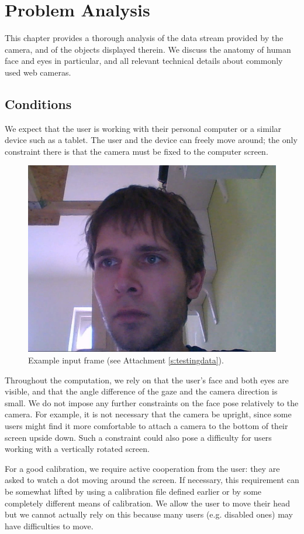 \chapter{Problem Analysis}
\label{s:analy}
This chapter provides a thorough analysis of the data stream provided by the camera, and of the objects displayed therein.
We discuss the anatomy of human face and eyes in particular, and all relevant technical details about commonly used web cameras.

\section{Conditions}

We expect that the user is working with their personal computer or a similar device such as a tablet.
The user and the device can freely move around; the only constraint there is that the camera must be fixed to the computer screen.

\begin{figure}[h]
	\centering \includegraphics[width=0.7\linewidth]{img/analy-shot.jpg}
	\caption{Example input frame (see Attachment \ref{s:testingdata}).}\label{i:analy-shot}
\end{figure}

Throughout the computation, we rely on that the user's face and both eyes are visible, and that the angle difference of the gaze and the camera direction is small.
We do not impose any further constraints on the face pose relatively to the camera.
For example, it is not necessary that the camera be upright, since some users might find it more comfortable to attach a camera to the bottom of their screen upside down.
Such a constraint could also pose a difficulty for users working with a vertically rotated screen.

For a good calibration, we require active cooperation from the user: they are asked to watch a dot moving around the screen.
If necessary, this requirement can be somewhat lifted by using a calibration file defined earlier or by some completely different means of calibration.
We allow the user to move their head but we cannot actually rely on this because many users (e.g. disabled ones) may have difficulties to move.

